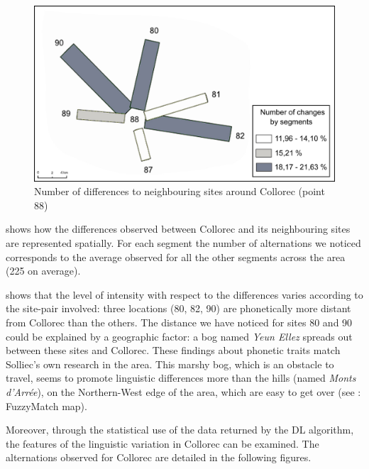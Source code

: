 \documentclass[output=paper]{LSP/langsci}
\begin{document}
\begin{figure}
\includegraphics[width=\textwidth]{illustrations/brun_etal_fig7}
\caption{Number of differences to neighbouring sites around Collorec (point 88)}
\label{fig:7}
\end{figure}

 shows how the differences observed between Collorec and its neighbouring sites are represented spatially. For each segment the number of alternations we noticed corresponds to the average observed for all the other segments across the area (225 on average).

 shows that the level of intensity with respect to the differences varies according to the site-pair involved: three locations (80, 82, 90) are phonetically more distant from Collorec than the others. The distance we have noticed for sites 80 and 90 could be explained by a geographic factor: a bog named \textit{Yeun Ellez} spreads out between these sites and Collorec. These findings about phonetic traits match Solliec's own research in the area. This marshy bog, which is an obstacle to travel, seems to promote linguistic differences more than the hills (named \textit{Monts d'Arrée}), on the Northern-West edge of the area, which are easy to get over (see : FuzzyMatch map).

Moreover, through the statistical use of the data returned by the DL algorithm, the features of the linguistic variation in Collorec can be examined. The alternations observed for Collorec are detailed in the following figures.
\end{document}
